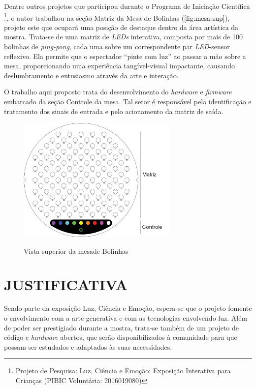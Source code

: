   Dentre outros projetos que participou durante o Programa de Iniciação Científica \footnote{Projeto de Pesquisa: Luz, Ciência e Emoção: Exposição Interativa para Crianças (PIBIC Voluntária: 2016019080)}, o autor trabalhou na seção Matriz da Mesa de Bolinhas (\autoref{fig:mesa-sup}), projeto este que ocupará uma posição de destaque dentro da área artística da mostra. Trata-se de uma matriz de \emph{LEDs} interativa, composta por mais de 100 bolinhas de \emph{ping-pong}, cada uma sobre um correspondente par \emph{LED}-sensor reflexivo. Ela permite que o espectador ``pinte com luz'' ao passar a mão sobre a mesa, proporcionando uma experiência tangível-visual impactante, causando deslumbramento e entusiasmo através da arte e interação.
  
  O trabalho aqui proposto trata do desenvolvimento do \emph{hardware} e \emph{firmware} embarcado da seção Controle da mesa. Tal setor é responsável pela identificação e tratamento dos sinais de entrada e pelo acionamento da matriz de saída.

\begin{figure}[H]%
    \centering
    \caption{Vista superior da mesade Bolinhas}
    \includegraphics[width=0.7\textwidth]{./dados/figuras/mesa-cad}
    \label{fig:mesa-sup}
\end{figure}

\section{JUSTIFICATIVA}
\label{sec:justificativa}

  Sendo parte da exposição Luz, Ciência e Emoção, espera-se que o projeto fomente o envolvimento com a arte generativa e com as tecnologias envolvendo luz. Além de poder ser prestigiado durante a mostra, trata-se também de um projeto de código e \emph{hardware} abertos, que serão disponibilizados à comunidade para que possam ser estudados e adaptados às suas necessidades.

